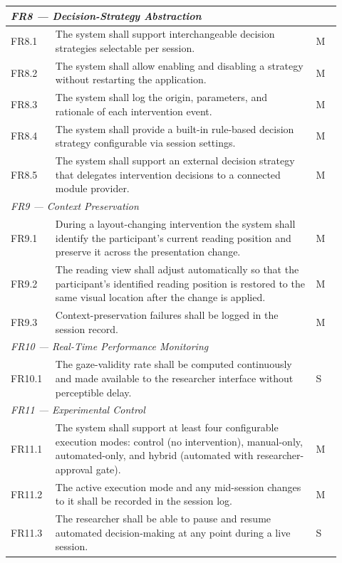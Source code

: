 \begin{longtable}{%
  p{0.12\linewidth}
  p{0.73\linewidth}
  p{0.07\linewidth}
}
\multicolumn{3}{l}{\textit{FR8 — Decision-Strategy Abstraction}} \\
\midrule
FR8.1 & The system shall support interchangeable decision strategies
        selectable per session. & M \\
FR8.2 & The system shall allow enabling and disabling a strategy without
        restarting the application. & M \\
FR8.3 & The system shall log the origin, parameters, and rationale of each
        intervention event. & M \\
FR8.4 & The system shall provide a built-in rule-based decision strategy
        configurable via session settings. & M \\
FR8.5 & The system shall support an external decision strategy that delegates
        intervention decisions to a connected module provider. & M \\
\midrule

\multicolumn{3}{l}{\textit{FR9 — Context Preservation}} \\
\midrule
FR9.1 & During a layout-changing intervention the system shall identify the
        participant's current reading position and preserve it across the
        presentation change. & M \\
FR9.2 & The reading view shall adjust automatically so that the participant's
        identified reading position is restored to the same visual location
        after the change is applied. & M \\
FR9.3 & Context-preservation failures shall be logged in the session record. & M \\
\midrule

\multicolumn{3}{l}{\textit{FR10 — Real-Time Performance Monitoring}} \\
\midrule
FR10.1 & The gaze-validity rate shall be computed continuously and made
         available to the researcher interface without perceptible delay. & S \\
\midrule

\multicolumn{3}{l}{\textit{FR11 — Experimental Control}} \\
\midrule
FR11.1 & The system shall support at least four configurable execution modes:
         control (no intervention), manual-only, automated-only, and hybrid
         (automated with researcher-approval gate). & M \\
FR11.2 & The active execution mode and any mid-session changes to it shall be
         recorded in the session log. & M \\
FR11.3 & The researcher shall be able to pause and resume automated
         decision-making at any point during a live session. & S \\
\midrule


\end{longtable}
